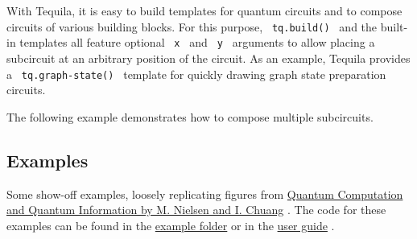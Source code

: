 With Tequila, it is easy to build templates for quantum circuits and to
compose circuits of various building blocks. For this purpose,
\texttt{\ tq.build()\ } and the built-in templates all feature optional
\texttt{\ x\ } and \texttt{\ y\ } arguments to allow placing a
subcircuit at an arbitrary position of the circuit. As an example,
Tequila provides a \texttt{\ tq.graph-state()\ } template for quickly
drawing graph state preparation circuits.

The following example demonstrates how to compose multiple subcircuits.

\begin{Shaded}
\begin{Highlighting}[]

\NormalTok{    ),}
\NormalTok{)}
\end{Highlighting}
\end{Shaded}


\subsection{Examples}\label{examples}

Some show-off examples, loosely replicating figures from
\href{https://www.cambridge.org/highereducation/books/quantum-computation-and-quantum-information/01E10196D0A682A6AEFFEA52D53BE9AE\#overview}{Quantum
Computation and Quantum Information by M. Nielsen and I. Chuang} . The
code for these examples can be found in the
\href{https://github.com/Mc-Zen/quill/tree/v0.5.0/examples}{example
folder} or in the
\href{https://github.com/Mc-Zen/quill/releases/download/v0.5.0/quill-guide.pdf}{user
guide} .



